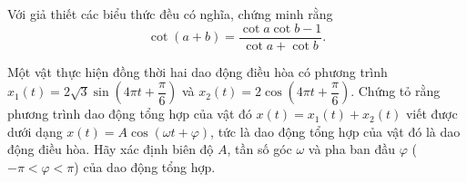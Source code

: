\begin{bt}[VDT]%
	Với giả thiết các biểu thức đều có nghĩa, chứng minh rằng
	$$\cot (a+b) = \dfrac{\cot a \cot b -1}{\cot a + \cot b}.$$
\end{bt}
\begin{bt}[VDC]%
	Một vật thực hiện đồng thời hai dao động điều hòa có phương trình $x_1(t) =2\sqrt{3} \sin \left(4\pi t+\dfrac{\pi}{6}\right)$ và $x_2(t) = 2\cos \left(4\pi t+\dfrac{\pi}{6}\right)$. Chứng tỏ rằng phương trình dao động tổng hợp của vật đó $x(t) = x_1(t)+x_2(t)$ viết được dưới dạng $x(t) = A\cos (\omega t + \varphi)$, tức là dao động tổng hợp của vật đó là dao động điều hòa. Hãy xác định biên độ $A$, tần số góc $\omega$ và pha ban đầu $\varphi$ ($-\pi<\varphi<\pi$) của dao động tổng hợp.
\end{bt}
